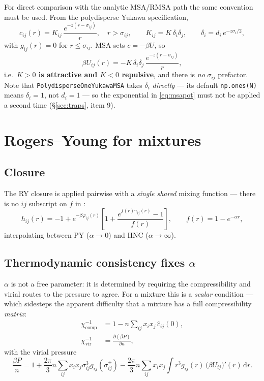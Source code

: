 \documentclass[11pt,a4paper]{article}
\newcommand{\code}[1]{\texttt{#1}}
\begin{document}
For direct comparison with the analytic MSA/RMSA path the same convention
must be used. From the polydisperse Yukawa specification,
\begin{equation}
c_{ij}(r) = K_{ij}\,\frac{e^{-z(r-\sigma_{ij})}}{r},\quad r>\sigma_{ij},
\qquad K_{ij}=K\,\delta_i\delta_j,
\qquad \delta_i = d_i\,e^{-z\sigma_i/2},
\label{eq:msapot}
\end{equation}
with $g_{ij}(r)=0$ for $r\le\sigma_{ij}$. MSA sets $c=-\beta U$, so
\begin{equation}
\beta U_{ij}(r) = -K\,\delta_i\delta_j\,\frac{e^{-z(r-\sigma_{ij})}}{r},
\end{equation}
i.e.\ \textbf{$K>0$ is attractive and $K<0$ repulsive}, and there is
\emph{no} $\sigma_{ij}$ prefactor. Note that
\code{PolydisperseOneYukawaMSA} takes $\delta_i$ \emph{directly} --- its
default \code{np.ones(N)} means $\delta_i=1$, not $d_i=1$ --- so the
exponential in \eqref{eq:msapot} must not be applied a second time
(\S\ref{sec:traps}, item 9).

\section{Rogers--Young for mixtures}

\subsection{Closure}

The RY closure is applied pairwise with a \emph{single shared} mixing
function --- there is no $ij$ subscript on $f$ in \cite{daguanno1991}:
\begin{equation}
h_{ij}(r) = -1 + e^{-\beta\varphi_{ij}(r)}
  \left[1+\frac{e^{f(r)\gamma_{ij}(r)}-1}{f(r)}\right],
\qquad
f(r) = 1-e^{-\alpha r},
\label{eq:ry}
\end{equation}
interpolating between PY ($\alpha\to0$) and HNC ($\alpha\to\infty$).

\subsection{Thermodynamic consistency fixes \texorpdfstring{$\alpha$}{alpha}}
\label{sec:alpha}

$\alpha$ is not a free parameter: it is determined by requiring the
compressibility and virial routes to the pressure to agree. For a mixture this
is a \emph{scalar} condition --- which sidesteps the apparent difficulty that
a mixture has a full compressibility \emph{matrix}:
\begin{align}
\chi^{-1}_{\text{comp}} &= 1 - n\sum_{ij}x_ix_j\,\hat c_{ij}(0),
\label{eq:chicomp}\\
\chi^{-1}_{\text{vir}} &= \frac{\partial(\beta P)}{\partial n},
\label{eq:chivir}
\end{align}
with the virial pressure
\begin{equation}
\frac{\beta P}{n} = 1
  + \frac{2\pi}{3}n\sum_{ij}x_ix_j\sigma_{ij}^3 g_{ij}(\sigma_{ij}^+)
  - \frac{2\pi}{3}n\sum_{ij}x_ix_j\int r^3 g_{ij}(r)\,
    \bigl(\beta U_{ij}\bigr)'(r)\,\mathrm{d}r .
\label{eq:virial}
\end{equation}
\end{document}
